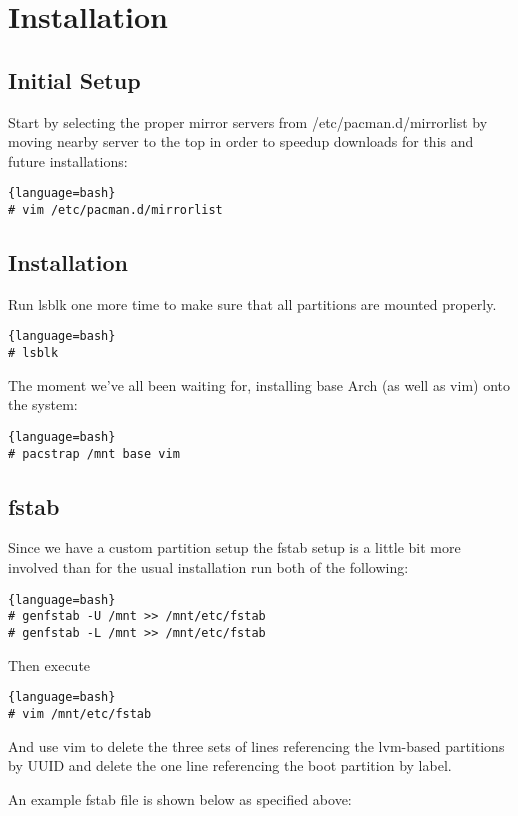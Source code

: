\section{Installation}
\subsection{Initial Setup}
Start by selecting the proper mirror servers from /etc/pacman.d/mirrorlist by moving nearby server to the top in order to speedup downloads for this and future installations:
\begin{lstlisting}{language=bash}
# vim /etc/pacman.d/mirrorlist
\end{lstlisting}
\subsection{Installation}
Run lsblk one more time to make sure that all partitions are mounted properly.
\begin{lstlisting}{language=bash}
# lsblk
\end{lstlisting}
The moment we've all been waiting for, installing base Arch (as well as vim) onto the system:
\begin{lstlisting}{language=bash}
# pacstrap /mnt base vim
\end{lstlisting}

\subsection{fstab}
Since we have a custom partition setup the fstab setup is a little bit more involved than for the usual installation run both of the following:
\begin{lstlisting}{language=bash}
# genfstab -U /mnt >> /mnt/etc/fstab
# genfstab -L /mnt >> /mnt/etc/fstab
\end{lstlisting}
Then execute
\begin{lstlisting}{language=bash}
# vim /mnt/etc/fstab
\end{lstlisting}
And use vim to delete the three sets of lines referencing the lvm-based partitions by UUID and delete the one line referencing the boot partition by label.

An example fstab file is shown below as specified above:
\inputminted[linenos, fontsize=\small, baselinestretch=0.875, frame=lines]{shell}{Sections/4/fstab.txt}

